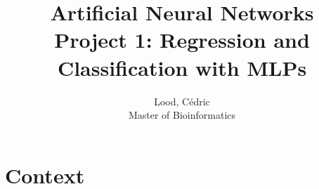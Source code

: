 \documentclass[11pt, a4paper]{article}
\title{ \huge Artificial Neural Networks \\ 
  { \large Project 1: Regression and Classification with MLPs }}
\author{
        Lood, Cédric \\
        \small Master of Bioinformatics
}
\begin{document}
\maketitle

\section{Context}


% 
\end{document}
